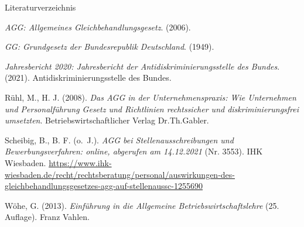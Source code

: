 \documentclass[
  10pt,
  ignorenonframetext,
]{beamer}
\newlength{\cslhangindent}
\newlength{\cslentryspacingunit} %
\newenvironment{CSLReferences}[2] %
 {%
  \setlength{\parindent}{0pt}
  \ifodd #1
  \let\oldpar\par
  \def\par{\hangindent=\cslhangindent\oldpar}
  \fi
  \setlength{\parskip}{#2\cslentryspacingunit}
 }%
 {}
\begin{document}
\begin{frame}{Literaturverzeichnis}
\hypertarget{refs}{}
\begin{CSLReferences}{1}{0}
\leavevmode{}%
\emph{AGG: Allgemeines Gleichbehandlungsgesetz}. (2006).

\leavevmode{}%
\emph{GG: Grundgesetz der Bundesrepublik Deutschland}. (1949).

\leavevmode{}%
\emph{Jahresbericht 2020: Jahresbericht der Antidiskriminierungsstelle
des Bundes}. (2021). Antidiskriminierungsstelle des Bundes.

\leavevmode{}%
Rühl, M., H. J. (2008). \emph{Das AGG in der Unternehmenspraxis: Wie
Unternehmen und Personalf{ü}hrung Gesetz und Richtlinien rechtssicher
und diskriminierungsfrei umsetzten}. Betriebswirtschaftlicher Verlag
Dr.Th.Gabler.

\leavevmode{}%
Scheibig, B., B. F. (o.~J.). \emph{AGG bei Stellenausschreibungen und
Bewerbungsverfahren: online, abgerufen am 14.12.2021} (Nr. 3553). IHK
Wiesbaden.
\url{https://www.ihk-wiesbaden.de/recht/rechtsberatung/personal/auswirkungen-des-gleichbehandlungsgesetzes-agg-auf-stellenaussc-1255690}

\leavevmode{}%
Wöhe, G. (2013). \emph{Einf{ü}hrung in die Allgemeine
Betriebswirtschaftslehre} (25. Auflage). Franz Vahlen.

\end{CSLReferences}
\end{frame}
\end{document}
